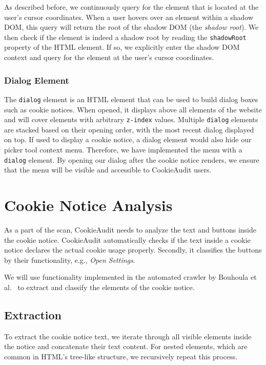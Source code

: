 As described before, we continuously query for the element that is located at the user's cursor coordinates.
When a user hovers over an element within a shadow DOM, this query will return the root of the shadow DOM (the \emph{shadow root}). 
We then check if the element is indeed a shadow root by reading the \verb|shadowRoot| property of the HTML element.
If so, we explicitly enter the shadow DOM context and query for the element at the user's cursor coordinates. 


\subsubsection{Dialog Element}
The \verb|dialog| element is an HTML element that can be used to build dialog boxes such as cookie notices.
When opened, it displays above all elements of the website and will cover elements with arbitrary \verb|z-index| values. 
Multiple \verb|dialog| elements are stacked based on their opening order, with the most recent dialog displayed on top.
If used to display a cookie notice, a dialog element would also hide our picker tool context menu.
Therefore, we have implemented the menu with a \verb|dialog| element.
By opening our dialog after the cookie notice renders, we ensure that the menu will be visible and accessible to CookieAudit users.

\section{Cookie Notice Analysis}
As a part of the scan, CookieAudit needs to analyze the text and buttons inside the cookie notice.
CookieAudit automatically checks if the text inside a cookie notice declares the actual cookie usage properly. Secondly, it classifies the buttons by their functionality, e.g., \emph{Open Settings}.

We will use functionality implemented in the automated crawler by Bouhoula et al.~\cite{bouhoula2023automated} to extract and classify the elements of the cookie notice. 

\subsection{Extraction} \label{subsec:extraction}
To extract the cookie notice text, we iterate through all visible elements inside the notice and concatenate their text content.
For nested elements, which are common in HTML's tree-like structure, we recursively repeat this process.

